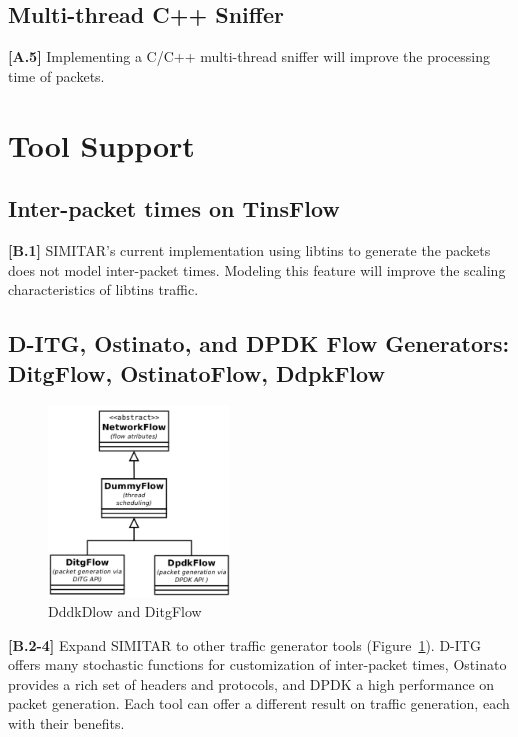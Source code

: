 \subsection{Multi-thread C++ Sniffer}

\textbf{[A.5]} Implementing a C/C++ multi-thread sniffer will improve the processing time of packets. 



\section{Tool Support}

\subsection{Inter-packet times on TinsFlow}

\textbf{[B.1]} SIMITAR’s current implementation using libtins to generate the packets does not model inter-packet times. Modeling this feature will improve the scaling characteristics of libtins traffic.

\subsection{D-ITG, Ostinato, and DPDK Flow Generators: DitgFlow, OstinatoFlow, DdpkFlow}

\begin{figure}[!ht]
    \centering
    \includegraphics[height=2.0in]{figures/ch6/dpdk-flow}
    \caption{DddkDlow and DitgFlow}
    \label{fig:dpdk-flow}
\end{figure}


\textbf{[B.2-4]} Expand SIMITAR to other traffic generator tools (Figure~\ref{fig:dpdk-flow}). D-ITG offers many stochastic functions for customization of inter-packet times, Ostinato provides a rich set of headers and protocols, and DPDK a high performance on packet generation. Each tool can offer a different result on traffic generation,  each with their benefits. 

